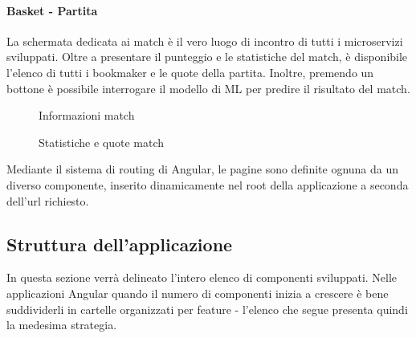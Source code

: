     \paragraph{Basket - Partita} La schermata dedicata ai match è il vero luogo di incontro di tutti i microservizi sviluppati. Oltre a presentare il punteggio e le statistiche del match, è disponibile l'elenco di tutti i bookmaker e le quote della partita. Inoltre, premendo un bottone è possibile interrogare il modello di ML per predire il risultato del match.
    \begin{figure}[H]
        \centering
        \caption{Informazioni match}
        \label{fig:enter-label}
    \end{figure}
    \begin{figure}[H]
        \centering
        \caption{Statistiche e quote match}
        \label{fig:enter-label}
    \end{figure}

Mediante il sistema di routing di Angular, le pagine sono definite ognuna da un diverso componente, inserito dinamicamente nel root della applicazione a seconda dell'url richiesto. 

\subsection{Struttura dell'applicazione}
In questa sezione verrà delineato l'intero elenco di componenti sviluppati. Nelle applicazioni Angular quando il numero di componenti inizia a crescere è bene suddividerli in cartelle organizzati per feature - l'elenco che segue presenta quindi la medesima strategia.

